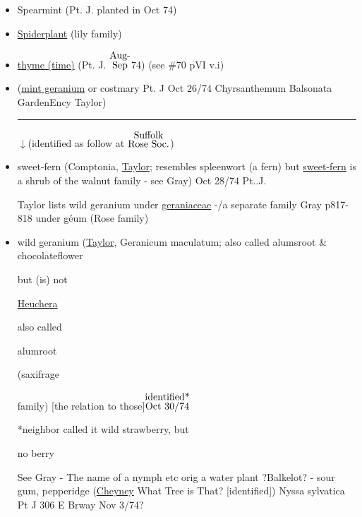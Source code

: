 \documentclass[a4paper,10pt]{article}
\begin{document}
\begin{flushleft}
\begin{itemize}
\color{blue}
\normalsize
Oct 18/74
\small
\color{red}
John Parkinson 1629 \ul{Paradisus Terrestis} ``The rarity \& novelty of this herb, being for the most part but in the gardens of great persons, doth cause it to be of great regard"
\color{blue}
\normalsize
\item Spearmint (Pt. J. planted in Oct 74)
\item \ul{Spiderplant} (lily family)
\item \ul{thyme (time)} (Pt. J. {$\stackrel{\hbox{Aug-}}{\hbox{Sep}}$}74) (see \#70 pVI v.i)
\item (\ul{mint geranium} or costmary Pt. J Oct 26/74 
Chyrsanthemum Balsonata GardenEncy Taylor)
\rule{10cm}{0.01cm}
\begin{flushright}
$\downarrow$(identified as follow at {$\stackrel{\hbox{Suffolk}}{\hbox{Rose Soc.}}$})
\end{flushright}
\item sweet-fern (Comptonia, \ul{Taylor}; resembles spleenwort (a fern) but \ul{sweet-fern} is a shrub of the walnut family - see Gray)
Oct 28/74 Pt..J.\par
\color{red}
\footnotesize
Taylor lists wild geranium under \ul{geraniaceae} -/a separate family 
Gray p817-818 %
under g\'eum (Rose family)
\color{blue}
\normalsize
\item wild geranium (\ul{Taylor}, Geranicum maculatum; also called alumsroot \& chocolateflower\par
\color{red}
but (is) not\par
\ul{Heuchera}\par
also called\par
 alumroot\par
(saxifrage\par
family)
\color{blue}
[the relation to those]{$\stackrel{\hbox{identified*}}{\hbox{Oct 30/74}}$}\par
*neighbor called it wild strawberry, but\par 
no berry\par
See Gray - The name of a nymph etc orig a water plant 
?Balkelot? - sour gum, pepperidge \color{red} (\ul{Cheyney} What Tree is That? [identified])
\color{blue}Nyssa sylvatica Pt J 306 E Brway Nov 3/74?



\end{itemize}
\end{flushleft}
\end{document}
